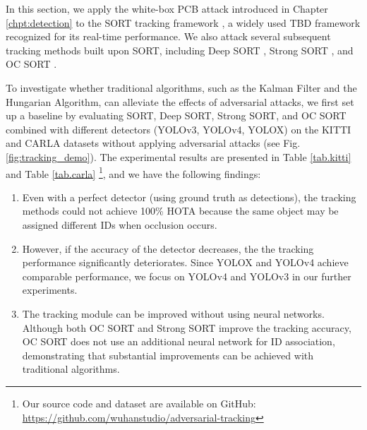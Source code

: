 In this section, we apply the white-box PCB attack introduced in Chapter \ref{chpt:detection} to the SORT tracking framework \citep{bewley2016simple}, a widely used TBD framework recognized for its real-time performance. We also attack several subsequent tracking methods built upon SORT, including Deep SORT \citep{wojke2017simple}, Strong SORT \citep{du2023strongsort}, and OC SORT \citep{cao2023observation}.

To investigate whether traditional algorithms, such as the Kalman Filter and the Hungarian Algorithm, can alleviate the effects of adversarial attacks, we first set up a baseline by evaluating SORT, Deep SORT, Strong SORT, and OC SORT combined with different detectors (YOLOv3, YOLOv4, YOLOX) on the KITTI and CARLA datasets without applying adversarial attacks (see Fig. \ref{fig:tracking_demo}). The experimental results are presented in Table \ref{tab.kitti} and Table \ref{tab.carla} \footnote{Our source code and dataset are available on GitHub: \url{https://github.com/wuhanstudio/adversarial-tracking}}, and we have the following findings:

\begin{enumerate}
    \item Even with a perfect detector (using ground truth as detections), the tracking methods could not achieve 100\% HOTA because the same object may be assigned different IDs when occlusion occurs.
    \item However, if the accuracy of the detector decreases, the the tracking performance significantly deteriorates. Since YOLOX and YOLOv4 achieve comparable performance, we focus on YOLOv4 and YOLOv3 in our further experiments.
    \item The tracking module can be improved without using neural networks. Although both OC SORT and Strong SORT improve the tracking accuracy, OC SORT does not use an additional neural network for ID association, demonstrating that substantial improvements can be achieved with traditional algorithms. 
\end{enumerate}



